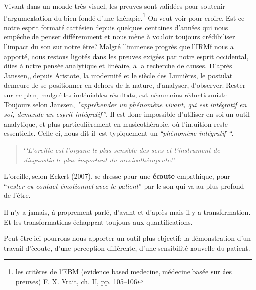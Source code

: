 Vivant dans un monde très visuel, les preuves sont
validées pour soutenir l'argumentation du bien-fondé d'une thérapie.\footnote{
	les critères de l'EBM (evidence based medecine, médecine basée sur des 
        preuves) F. X. Vrait, ch. II, pp. 105--106 }
On veut voir pour croire. Est-ce 
notre esprit formaté cartésien depuis quelques centaines d'années qui nous 
empêche de penser différemment 
et nous mène à vouloir toujours crédibiliser l'impact 
du son sur notre être?
Malgré l'immense progrès que l'IRMf nous a apporté, nous restons
  ligotés dans les preuves exigées par notre esprit occidental, dûes à
  notre pensée analytique et linéaire, à la recherche de
  causes. D'après Janssen,\autocite[201]{van_eersel_cerveau}, depuis Aristote, la modernité et le
siècle des Lumières, le postulat demeure de se positionner en dehors
de la nature, d'analyser, d'observer. Rester sur ce plan, malgré les
indéniables résultats, est néanmoins
réductionniste. Toujours selon Janssen,
\textit{"appréhender un phénomène vivant, qui est intégratif en soi, demande un esprit
intégratif''}. Il est donc impossible d'utiliser en soi un outil analytique, et
plus 
particulièrement en musicothérapie, où l'intuition reste essentielle.
Celle-ci, nous
dit-il, est typiquement un \textit{``phénomène intégratif ``}.

 
\begin{quotation}
	`\textit{`L'oreille est l'organe le plus sensible des sens 
et l'instrument de diagnostic  le plus important du
musicothérapeute}.''\autocite{seminar_zuerich}
 \end{quotation}	
 L'oreille, selon Eckert (2007), se dresse pour une\textbf{ écoute} empathique, pour ``\textit{rester en contact émotionnel  
 avec le patient}'' par le son qui va au plus profond de
 l'être.

Il n'y a
jamais, à proprement parlé, d'avant et d'après mais il y a transformation.
Et les transformations échappent toujours aux quantifications.

Peut-être
ici pourrons-nous apporter un outil plus objectif: la démonstration d'un travail d'écoute, d'une perception
différente, d'une sensibilité nouvelle du patient.

